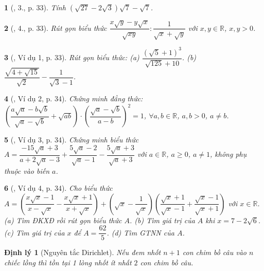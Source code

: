 \documentclass{article}
\newtheorem{baitoan}{}%
\newtheorem{dinhly}{Định lý}
\begin{document}
\begin{baitoan}[\cite{Binh_boi_duong_Toan_9_tap_1}, 3., p. 33]
	Tính $(\sqrt{27} - 2\sqrt{3})\sqrt{7} - \sqrt{7}$.
\end{baitoan}

\begin{baitoan}[\cite{Binh_boi_duong_Toan_9_tap_1}, 4., p. 33]
	Rút gọn biểu thức $\dfrac{x\sqrt{y} - y\sqrt{x}}{\sqrt{xy}}:\dfrac{1}{\sqrt{x} + \sqrt{y}}$ với $x,y\in\mathbb{R}$, $x,y > 0$.
\end{baitoan}

\begin{baitoan}[\cite{Binh_boi_duong_Toan_9_tap_1}, Ví dụ 1, p. 33]
	Rút gọn biểu thức: (a) $\dfrac{(\sqrt{5} + 1)^3}{\sqrt{125} + 10}$. (b) $\dfrac{\sqrt{4 + \sqrt{15}}}{\sqrt{2}} - \dfrac{1}{\sqrt{3} - 1}$.
\end{baitoan}

\begin{baitoan}[\cite{Binh_boi_duong_Toan_9_tap_1}, Ví dụ 2, p. 34]
	Chứng minh đẳng thức: $\left(\dfrac{a\sqrt{a} - b\sqrt{b}}{\sqrt{a} - \sqrt{b}} + \sqrt{ab}\right)\cdot\left(\dfrac{\sqrt{a} - \sqrt{b}}{a - b}\right)^2 = 1$, $\forall a,b\in\mathbb{R}$, $a,b > 0$, $a\ne b$.
\end{baitoan}

\begin{baitoan}[\cite{Binh_boi_duong_Toan_9_tap_1}, Ví dụ 3, p. 34]
	Chứng minh biểu thức $A = \dfrac{-15\sqrt{a} + 3}{a + 2\sqrt{a} - 3} + \dfrac{5\sqrt{a} - 2}{\sqrt{a} - 1} - \dfrac{5\sqrt{a} + 3}{\sqrt{a} + 3}$ với $a\in\mathbb{R}$, $a\ge0$, $a\ne1$, không phụ thuộc vào biến $a$.
\end{baitoan}

\begin{baitoan}[\cite{Binh_boi_duong_Toan_9_tap_1}, Ví dụ 4, p. 34]
	Cho biểu thức $A = \left(\dfrac{x\sqrt{x} - 1}{x - \sqrt{x}} - \dfrac{x\sqrt{x} + 1}{x + \sqrt{x}}\right) + \left(\sqrt{x} - \dfrac{1}{\sqrt{x}}\right)\left(\dfrac{\sqrt{x} + 1}{\sqrt{x} - 1} + \dfrac{\sqrt{x} - 1}{\sqrt{x} + 1}\right)$ với $x\in\mathbb{R}$. (a) Tìm {\rm ĐKXĐ} rồi rút gọn biểu thức $A$. (b) Tìm giá trị của $A$ khi $x = 7 - 2\sqrt{6}$. (c) Tìm giá trị của $x$ để $A = \dfrac{62}{5}$. (d) Tìm {\rm GTNN} của $A$.
\end{baitoan}

\begin{dinhly}[Nguyên tắc Dirichlet]
	Nếu đem nhốt $n + 1$ con chim bồ câu vào $n$ chiếc lồng thì tồn tại 1 lòng nhốt ít nhất $2$ con chim bồ câu.
\end{dinhly}
\end{document}
